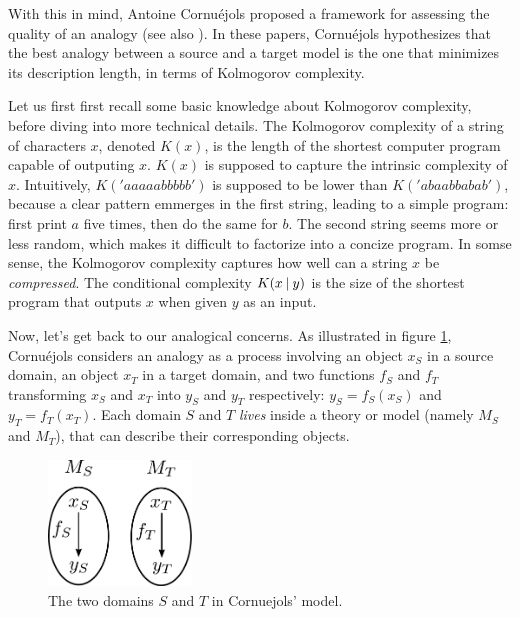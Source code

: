 With this in mind, Antoine Cornuéjols proposed a framework for assessing the
quality of an analogy \cite{CorMLS96} (see also \cite{CorJFA96}). In these
papers, Cornuéjols hypothesizes that the best analogy between a source and a
target model is the one that minimizes its description length, in terms of
Kolmogorov complexity.

Let us first first recall some basic knowledge about Kolmogorov complexity,
before diving into more technical details. The Kolmogorov complexity of a
string of characters $x$, denoted $K(x)$, is the length of the shortest
computer program capable of outputing $x$. $K(x)$ is supposed to capture the
intrinsic complexity of $x$. Intuitively, $K('aaaaabbbbb')$ is supposed to be
lower than $K('abaabbabab')$, because a clear pattern emmerges in the first
string, leading to a simple program: first print $a$ five times, then do the
same for $b$. The second string seems more or less random, which makes it
difficult to factorize into a concize program. In somse sense, the Kolmogorov
complexity captures how well can a string $x$ be \textit{compressed}. The
conditional complexity $K(x \:\vert\: y)$ is the size of the shortest program that
outputs $x$ when given $y$ as an input.

Now, let's get back to our analogical concerns. As illustrated in figure
\ref{FIG:cornuejols_model}, Cornuéjols considers an analogy as a process
involving an object $x_S$ in a source domain, an object $x_T$ in a target
domain, and two functions $f_S$ and $f_T$ transforming $x_S$ and $x_T$ into
$y_S$ and $y_T$ respectively: $y_S = f_S(x_S)$ and $y_T = f_T(x_T)$. Each
domain $S$ and $T$ \textit{lives} inside a theory or model (namely $M_S$ and
$M_T$), that can describe their corresponding objects.

\begin{figure}[!h]
\centering
\includegraphics[width=1.5in]{figures/cornuejols_model.pdf}
\caption{The two domains $S$ and $T$ in Cornuejols' model.}
\label{FIG:cornuejols_model}
\end{figure}


